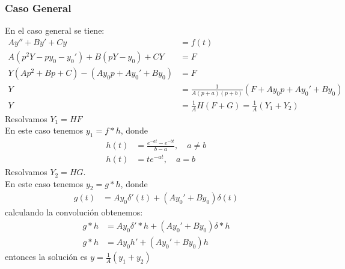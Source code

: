 \documentclass{article}
\begin{document}
\begin{tcolorbox}
    \subsubsection*{Caso General}
    En el caso general se tiene:
    \begin{align*}
        Ay'' + By' + Cy &= f(t)\\
        A(p^2Y - py_0 - y_0') + B(pY - y_0) + CY &= F \\
        Y(Ap^2 + Bp + C) - (Ay_0p + Ay_0' + By_0) &= F \\
        Y &= \frac{1}{A(p+a)(p+b)}(F + Ay_0p + Ay_0' + By_0) \\
        Y &= \frac{1}{A}H(F + G) = \frac{1}{A} (Y_1 + Y_2) 
    \end{align*} 
    Resolvamos $Y_1 = HF$ \\ 
    En este caso tenemos $y_1 = f*h$, donde 
    \begin{align*}
        h(t) &= \frac{e^{-at} - e^{-bt}}{b-a},\quad a \neq b \\ 
        h(t) &= te^{-at},\quad a=b
    \end{align*}
    Resolvamos $Y_2 = HG$. \\
    En este caso tenemos $y_2 = g*h$, donde 
    \begin{align*}
        g(t) &= Ay_0\delta'(t) + (Ay_0' + By_0)\delta(t)
    \end{align*}
    calculando la convolución obtenemos:
    \begin{align*}
        g*h &=Ay_0 \delta'*h + (Ay_0' + By_0) \delta*h \\
        g*h &=Ay_0h' + (Ay_0' + By_0)h
    \end{align*}
    entonces la solución es $y = \frac{1}{A} (y_1 + y_2)$
\end{tcolorbox}
\end{document}
